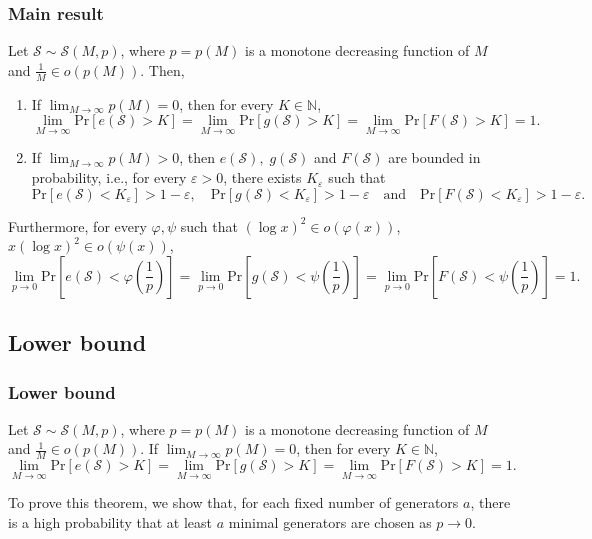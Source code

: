 \documentclass{beamer}
\def\N{\ensuremath{\mathbb{N}}}
\def\Pr{\ensuremath{\mathrm{Pr}}}
\begin{document}
\begin{frame}
    \frametitle{Main result}
    \fontsize{8pt}{7.2}\selectfont
    \begin{theorem}\label{thm:main}
        Let $\mathcal{S} \sim \mathcal{S}(M, p)$, where $p = p(M)$ is a monotone decreasing function of $M$ and $\frac{1}{M} \in o(p(M))$. Then, 
    \begin{enumerate}
        \item If $\lim_{M \to \infty} p(M) = 0$, then for every $K \in \N$,   
        \[\lim_{M \to \infty} \Pr[e(\mathcal{S}) > K] = \lim_{M \to \infty} \Pr[g(\mathcal{S}) > K] = \lim_{M \to \infty} \Pr[F(\mathcal{S}) > K] = 1.\]
        \item If $\lim_{M \to \infty} p(M) > 0$, then $e(\mathcal{S}), \; g(\mathcal{S})$ and $F(\mathcal{S})$ are bounded in probability, i.e., for every $\varepsilon > 0$, there exists $K_\varepsilon$ such that 
        \[ \Pr[e(\mathcal{S}) < K_\varepsilon] > 1 - \varepsilon, \quad  \Pr[g(\mathcal{S}) < K_\varepsilon] > 1- \varepsilon \quad \text{and} \quad \Pr[F(\mathcal{S}) < K_\varepsilon] > 1 - \varepsilon.\]
    \end{enumerate}
    Furthermore, for every $\varphi, \psi$ such that $(\log x)^2 \in o(\varphi(x))$, $x(\log x)^2 \in o(\psi(x))$,
    \[\lim_{p \to 0} \Pr\left[e(\mathcal{S}) < \varphi\left(\frac{1}{p}\right)\right] = \lim_{p \to 0} \Pr\left[g(\mathcal{S}) < \psi\left(\frac{1}{p}\right)\right]  = \lim_{p \to 0} \Pr\left[F(\mathcal{S}) < \psi\left(\frac{1}{p}\right)\right] = 1.\]
    \end{theorem}
\end{frame}

\subsection{Lower bound}

\begin{frame}
\frametitle{Lower bound}
\begin{theorem}
    Let $\mathcal{S} \sim \mathcal{S}(M, p)$, where $p = p(M)$ is a monotone decreasing function of $M$ and $\frac{1}{M} \in o(p(M))$.
    If $\lim_{M \to \infty} p(M) = 0$, then for every $K \in \N$,   
    \[\lim_{M \to \infty} \Pr[e(\mathcal{S}) > K] = \lim_{M \to \infty} \Pr[g(\mathcal{S}) > K] = \lim_{M \to \infty} \Pr[F(\mathcal{S}) > K] = 1.\]
\end{theorem}
To prove this theorem, we show that, for each fixed number of generators $a$, there is a high probability that at least $a$ minimal generators are chosen as $p \to 0$.
\end{frame}
\end{document}
